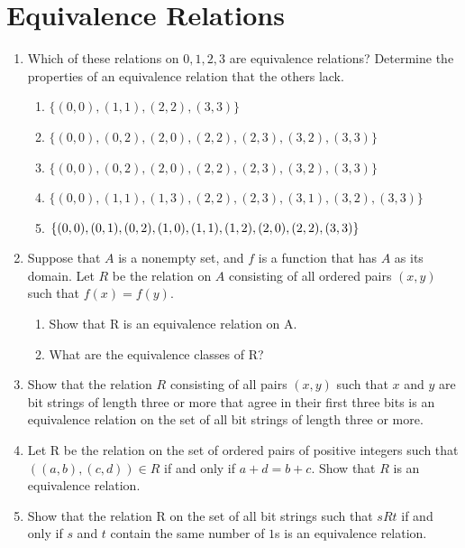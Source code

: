 \documentclass{sig-alternate-05-2015}
\begin{document}
\section{Equivalence Relations}
\begin{enumerate}
\item Which of these relations on ${0, 1, 2, 3}$ are equivalence
relations? Determine the properties of an equivalence relation
that the others lack.
	\begin{enumerate}
		\item $\{(0, 0), (1, 1), (2, 2), (3, 3)\}$
		\item $\{(0, 0), (0, 2), (2, 0), (2, 2), (2, 3), (3, 2), (3, 3)\}$
		\item $\{(0, 0), (0, 2), (2, 0), (2, 2), (2, 3), (3, 2), (3, 3)\}$
		\item $\{(0, 0), (1, 1), (1, 3), (2, 2), (2, 3), (3, 1), (3, 2),
			(3, 3)\}$
		\item $\{(0, 0), (0, 1), (0, 2), (1, 0), (1, 1), (1, 2), (2, 0),\\
			(2, 2), (3, 3)\}$
	\end{enumerate}
	
\item Suppose that $A$ is a nonempty set, and $f$ is a function that
has $A$ as its domain. Let $R$ be the relation on $A$ consisting
of all ordered pairs $(x, y)$ such that $f (x) = f (y)$.
	\begin{enumerate}
		\item Show that R is an equivalence relation on A.
		\item What are the equivalence classes of R?
	\end{enumerate}
	
\item Show that the relation $R$ consisting of all pairs $(x, y)$ such
that $x$ and $y$ are bit strings of length three or more that
agree in their first three bits is an equivalence relation on
the set of all bit strings of length three or more.

\item Let R be the relation on the set of ordered pairs of positive
integers such that $((a, b), (c, d)) \in R $ if and only if
$a + d = b + c$. Show that $R$ is an equivalence relation.

\item Show that the relation R on the set of all bit strings such
that $s R t$ if and only if $s$ and $t$ contain the same number
of $1$s is an equivalence relation.


\end{enumerate}
\end{document}
